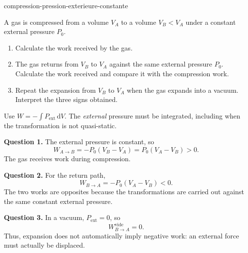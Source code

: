 \begin{exo}{compression-pression-exterieure-constante}

A gas is compressed from a volume $V_A$ to a volume $V_B<V_A$ under a
constant external pressure $P_0$.

\begin{enumerate}
\item Calculate the work received by the gas.
\item The gas returns from $V_B$ to $V_A$ against the same external pressure $P_0$. Calculate the work received and compare it with the compression work.
\item Repeat the expansion from $V_B$ to $V_A$ when the gas expands into a vacuum. Interpret the three signs obtained.
\end{enumerate}

\begin{indication}
Use $W=-\int P_{\mathrm{ext}}\,\mathrm{d}V$. The \emph{external} pressure must
be integrated, including when the transformation is not quasi-static.
\end{indication}

\begin{solution}
\textbf{Question 1.} The external pressure is constant, so
\[
W_{A\to B}=-P_0(V_B-V_A)=P_0(V_A-V_B)>0.
\]
The gas receives work during compression.

\textbf{Question 2.} For the return path,
\[
W_{B\to A}=-P_0(V_A-V_B)<0.
\]
The two works are opposites because the transformations are carried out
against the same constant external pressure.

\textbf{Question 3.} In a vacuum, $P_{\mathrm{ext}}=0$, so
\[
W_{B\to A}^{\mathrm{vide}}=0.
\]
Thus, expansion does not automatically imply negative work: an external
force must actually be displaced.
\end{solution}
\end{exo}
